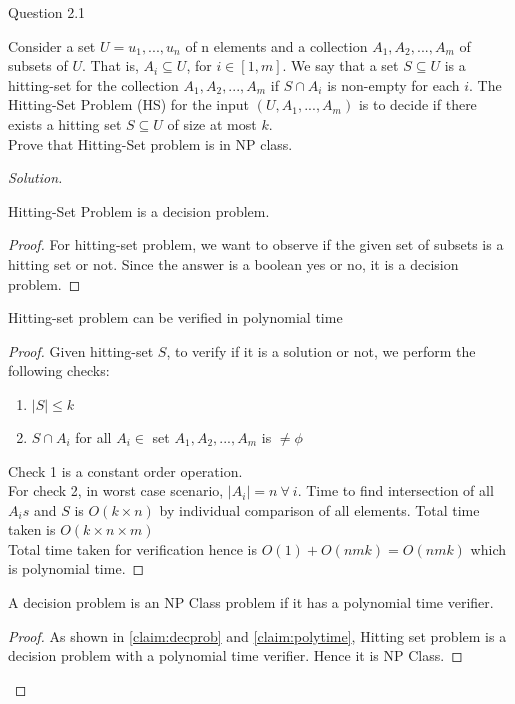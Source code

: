 \begin{solution}{Question 2.1}\label{ques:21}
    \begin{question}
    Consider a set $U = {u_1, . . . , u_n}$ of n elements and a collection $A_1, A_2, . . . , A_m$ of subsets of $U$. That is, $A_i \subseteq U $, for $ i \in [1, m]$. We say that a set $S \subseteq U$ is a hitting-set for the collection $A_1, A_2, . . . , A_m$ if $S \cap A_i$ is non-empty for each $i$. The Hitting-Set Problem (HS) for the input $(U, A_1, . . . , A_m)$ is to decide if there exists a hitting set $S \subseteq U$ of size at most $k$.\\
    Prove that Hitting-Set problem is in NP class.

    \end{question}
    \tcblower{}
    \begin{proof}[Solution]
    \begin{claim} \label{claim:decprob}
    Hitting-Set Problem is a decision problem.
    \end{claim}
    \begin{proof}
    For hitting-set problem, we want to observe if the given set of subsets is a hitting set or not. Since the answer is a boolean yes or no, it is a decision problem.
    \end{proof}
    
    \begin{claim} \label{claim:polytime}
    Hitting-set problem can be verified in polynomial time 
    \end{claim}
    \begin{proof}
    Given hitting-set $S$, to verify if it is a solution or not, we perform the following checks:
    \begin{enumerate}
        \item $|S| \leq k $
        \item $S \cap A_i$ for all $A_i \in$ set $A_1, A_2, . . . , A_m$ is $\neq \phi$
    \end{enumerate}
    Check 1 is a constant order operation.\\
    For check 2, in worst case scenario, $|A_i|=n \ \forall \ i$. Time to find intersection of all $A_{i}s$ and $S$ is $O(k \times n)$ by individual comparison of all elements. Total time taken is $O(k \times n \times m)$\\
    Total time taken for verification hence is $O(1)+O(nmk) = O(nmk)$ which is polynomial time.
    \end{proof}
    
    \begin{theorem}
    A decision problem is an NP Class problem if it has a polynomial time verifier.
    \end{theorem}
    \begin{proof}
    As shown in \ref{claim:decprob} and \ref{claim:polytime}, Hitting set problem is a decision problem with a polynomial time verifier. Hence it is NP Class.
    \end{proof}
    
    \end{proof}
\end{solution}
